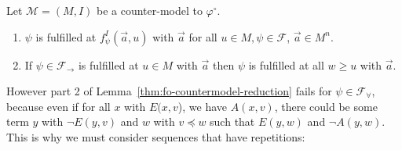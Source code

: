 \documentclass[a4paper,UKenglish,cleveref, autoref, thm-restate]{lipics-v2021}
\begin{document}
\begin{lemma}
\label{thm:fo-countermodel-reduction}
	Let $\mathcal M = (M, I)$ be a counter-model to $\mathcal \varphi^\circ$.
	\begin{enumerate}
		\item $\psi$ is fulfilled at $f_\psi^I(\vec a, u)$ with $\vec a$ for all $u\in M, \psi\in\mathcal F$, $\vec a\in M^n$.
		\item If $\psi\in\mathcal F_\to$ is fulfilled at $u\in M$ with $\vec a$ then $\psi$ is fulfilled at all $w\geq u$ with $\vec a$.
	\end{enumerate}	
\end{lemma}

However part 2 of Lemma~\ref{thm:fo-countermodel-reduction} fails for $\psi\in\mathcal F_\forall$, because even if for all $x$ with $E(x, v$), we have $A(x, v)$, there could be some term $y$ with $\neg E(y, v)$ and $w$ with $v\preceq w$ such that $E(y, w)$ and $\neg A(y, w)$. This is why we must consider sequences that have repetitions:
\end{document}
